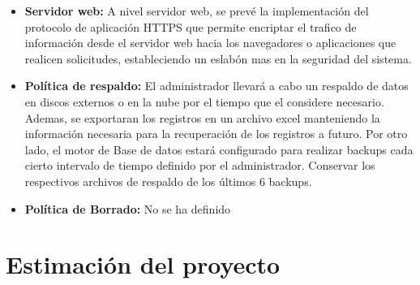 \begin{itemize}
        \item \textbf{Servidor web:} A nivel servidor web, se prevé la implementación del protocolo de aplicación HTTPS que permite encriptar el trafico de información desde el servidor web hacia los navegadores o aplicaciones que realicen solicitudes, estableciendo un eslabón mas en la seguridad del sistema.
        \item \textbf{Política de respaldo:} El administrador llevará a cabo un respaldo de datos en discos externos o en la nube por el tiempo que el considere necesario. Ademas, se exportaran los registros en un archivo excel manteniendo la información necesaria para la recuperación de los registros a futuro.
        Por otro lado, el motor de Base de datos estará configurado para realizar backups cada cierto intervalo de tiempo definido por el administrador. Conservar los respectivos archivos de respaldo de los últimos 6 backups.
        \item \textbf{Política de Borrado:} No se ha definido
      \end{itemize}
      
  \section{Estimación del proyecto}

